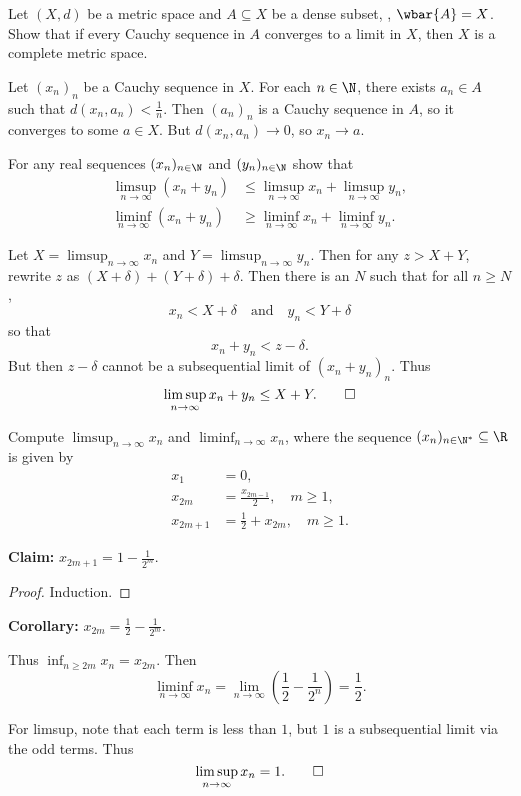 \documentclass[12pt]{article}
\begin{document}
\begin{problem*}
    Let $(X, d)$ be a metric space and $A \subseteq X$ be a dense subset,
    \ie, $\wbar{A} = X$.
    Show that if every Cauchy sequence in $A$ converges to a limit in $X$,
    then $X$ is a complete metric space.
\end{problem*}
\begin{solution}
    Let $(x_n)_n$ be a Cauchy sequence in $X$.
    For each $n \in \N$, there exists $a_n \in A$ such that
    $d(x_n, a_n) < \frac1n$.
    Then $(a_n)_n$ is a Cauchy sequence in $A$, so it converges to some
    $a \in X$.
    But $d(x_n, a_n) \to 0$, so $x_n \to a$.
\end{solution}

\begin{problem*}
    For any real sequences $(x_n)_{n \in \N}$ and $(y_n)_{n \in \N}$
    show that \begin{align*}
        \limsup_{n \to \infty} (x_n + y_n) &\le \limsup_{n \to \infty} x_n + \limsup_{n \to \infty} y_n, \\
        \liminf_{n \to \infty} (x_n + y_n) &\ge \liminf_{n \to \infty} x_n + \liminf_{n \to \infty} y_n.
    \end{align*}
\end{problem*}
\begin{solution}
    Let $X = \limsup_{n \to \infty} x_n$ and
    $Y = \limsup_{n \to \infty} y_n$.
    Then for any $z > X + Y$, rewrite $z$ as
    $(X + \delta) + (Y + \delta) + \delta$.
    Then there is an $N$ such that for all $n \ge N$, \[
        x_n < X + \delta \quad \text{and} \quad y_n < Y + \delta
    \] so that \[
        x_n + y_n < z - \delta.
    \] But then $z - \delta$ cannot be a subsequential limit of
    $(x_n + y_n)_n$.
    Thus \[
        \limsup_{n \to \infty} x_n + y_n \le X + Y. \qedhere
    \]
\end{solution}

\begin{problem*}
    Compute $\limsup_{n \to \infty} x_n$ and $\liminf_{n \to \infty} x_n$,
    where the sequence $(x_n)_{n \in \N^*} \subseteq \R$
    is given by \begin{align*}
        x_1    &= 0, \\
        x_{2m}   &= \frac{x_{2m-1}}{2}, \quad m \ge 1, \\
        x_{2m+1} &= \frac12 + x_{2m}, \quad m \ge 1.
    \end{align*}
\end{problem*}
\begin{solution}
    \textbf{Claim:} $x_{2m+1} = 1 - \frac{1}{2^m}$.
    \begin{proof}
        Induction.
    \end{proof}
    \textbf{Corollary:} $x_{2m} = \frac12 - \frac{1}{2^m}$.

    Thus $\inf_{n \ge 2m} x_n = x_{2m}$.
    Then \[
        \liminf_{n \to \infty} x_n = \lim_{n \to \infty} \left(\frac12 - \frac1{2^n}\right) = \frac12.
    \]

    For limsup, note that each term is less than $1$, but $1$ is a
    subsequential limit via the odd terms.
    Thus \[
        \limsup_{n \to \infty} x_n = 1. \qedhere
    \]
\end{solution}
\end{document}
